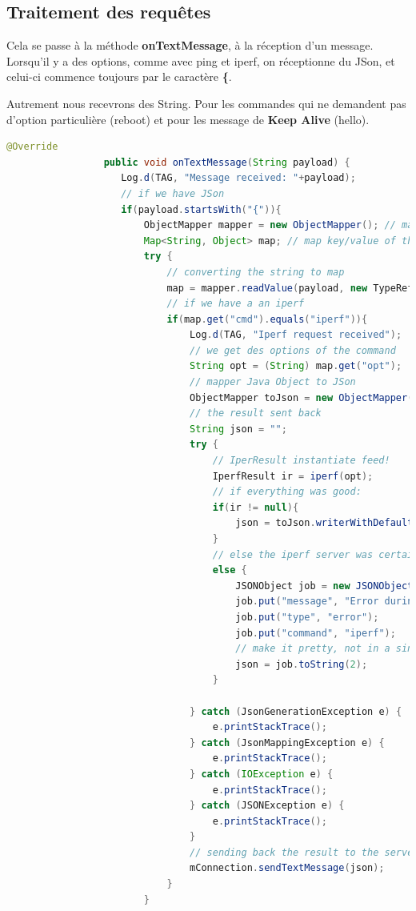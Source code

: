 \subsection{Traitement des requêtes}
Cela se passe à la méthode \textbf{onTextMessage}, à la réception d'un message. Lorsqu'il y a des options, comme avec ping et iperf, on réceptionne du JSon, et celui-ci commence toujours par le caractère \textbf{\{}.

Autrement nous recevrons des String. Pour les commandes qui ne demandent pas d'option particulière (reboot) et pour les message de \textbf{Keep Alive} (hello).

\begin{lstlisting}[language=Java, caption={Réception d'une commande avec options}]
@Override
		         public void onTextMessage(String payload) {
		            Log.d(TAG, "Message received: "+payload);
		            // if we have JSon
		            if(payload.startsWith("{")){
		            	ObjectMapper mapper = new ObjectMapper(); // mapper String Json to map
		            	Map<String, Object> map; // map key/value of the json recept
		            	try {
		            		// converting the string to map
							map = mapper.readValue(payload, new TypeReference<Map<String, Object>>() {});
							// if we have a an iperf
							if(map.get("cmd").equals("iperf")){
								Log.d(TAG, "Iperf request received");
								// we get des options of the command
								String opt = (String) map.get("opt");
								// mapper Java Object to JSon
								ObjectMapper toJson = new ObjectMapper();
								// the result sent back
								String json = "";
								try {
									// IperResult instantiate feed!
									IperfResult ir = iperf(opt);
									// if everything was good:
									if(ir != null){
										json = toJson.writerWithDefaultPrettyPrinter().writeValueAsString(ir);
									}
									// else the iperf server was certainly down. Creating a new JSon.
									else {
										JSONObject job = new JSONObject();
										job.put("message", "Error during iperf. Check if iperf server is up!");
										job.put("type", "error");
										job.put("command", "iperf");
										// make it pretty, not in a single line
										json = job.toString(2);
									}
									
								} catch (JsonGenerationException e) {
									e.printStackTrace();
								} catch (JsonMappingException e) {
									e.printStackTrace();
								} catch (IOException e) {
									e.printStackTrace();
								} catch (JSONException e) {
									e.printStackTrace();
								}
								// sending back the result to the server
								mConnection.sendTextMessage(json);
							}
						}
\end{lstlisting}

